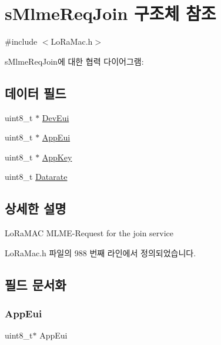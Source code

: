 \hypertarget{structs_mlme_req_join}{}\section{s\+Mlme\+Req\+Join 구조체 참조}
\label{structs_mlme_req_join}


{\ttfamily \#include $<$Lo\+Ra\+Mac.\+h$>$}



s\+Mlme\+Req\+Join에 대한 협력 다이어그램\+:
\subsection*{데이터 필드}
\begin{DoxyCompactItemize}
\item 
uint8\+\_\+t $\ast$ \mbox{\hyperlink{structs_mlme_req_join_a2aa72c6d37233b51e7ae46f85398f888}{Dev\+Eui}}
\item 
uint8\+\_\+t $\ast$ \mbox{\hyperlink{structs_mlme_req_join_a9bef8882015afeb26d9a7fb5d601df96}{App\+Eui}}
\item 
uint8\+\_\+t $\ast$ \mbox{\hyperlink{structs_mlme_req_join_a560c2bd9214ee75105acac8593614bd9}{App\+Key}}
\item 
uint8\+\_\+t \mbox{\hyperlink{structs_mlme_req_join_a780280c12645b2666878162aab5d8cad}{Datarate}}
\end{DoxyCompactItemize}


\subsection{상세한 설명}
Lo\+Ra\+M\+AC M\+L\+M\+E-\/\+Request for the join service 

Lo\+Ra\+Mac.\+h 파일의 988 번째 라인에서 정의되었습니다.



\subsection{필드 문서화}
\mbox{\label{structs_mlme_req_join_a9bef8882015afeb26d9a7fb5d601df96}} 
\subsubsection{\texorpdfstring{App\+Eui}{AppEui}}
{\footnotesize\ttfamily uint8\+\_\+t$\ast$ App\+Eui}

